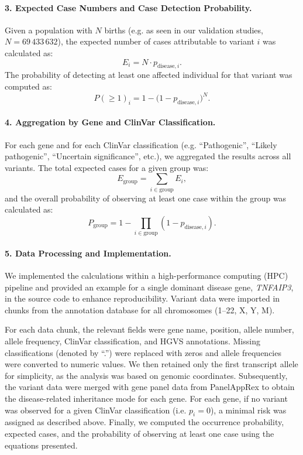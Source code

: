 \paragraph{3. Expected Case Numbers and Case Detection Probability.}
Given a population with \(N\) births (e.g. as seen in our validation studies, \(N = 69\,433\,632\)), the expected number of cases attributable to variant \(i\) was calculated as:
\[
E_i = N \cdot p_{\text{disease},i}.
\]
The probability of detecting at least one affected individual for that variant was computed as:
\[
P(\geq 1)_i = 1 - \bigl(1 - p_{\text{disease},i}\bigr)^N.
\]

\paragraph{4. Aggregation by Gene and ClinVar Classification.}
For each gene and for each ClinVar classification (e.g. “Pathogenic”, “Likely pathogenic”, “Uncertain significance”, etc.), we aggregated the results across all variants. The total expected cases for a given group was:
\[
E_{\text{group}} = \sum_{i \in \text{group}} E_i,
\]
and the overall probability of observing at least one case within the group was calculated as:
\[
P_{\text{group}} = 1 - \prod_{i \in \text{group}} \left(1 - p_{\text{disease},i}\right).
\]

\paragraph{5. Data Processing and Implementation.}
We implemented the calculations within a high-performance computing (HPC) pipeline and provided an example for a single dominant disease gene, \textit{TNFAIP3}, in the source code to enhance reproducibility. Variant data were imported in chunks from the annotation database for all chromosomes (1--22, X, Y, M). 

For each data chunk, the relevant fields were gene name, position, allele number, allele frequency, ClinVar classification, and HGVS annotations. Missing classifications (denoted by ``.'') were replaced with zeros and allele frequencies were converted to numeric values. We then retained only the first transcript allele for simplicity, as the analysis was based on genomic coordinates. Subsequently, the variant data were merged with gene panel data from PanelAppRex to obtain the disease-related inheritance mode for each gene. For each gene, if no variant was observed for a given ClinVar classification (i.e. \(p_i = 0\)), a minimal risk was assigned as described above. Finally, we computed the occurrence probability, expected cases, and the probability of observing at least one case using the equations presented.

